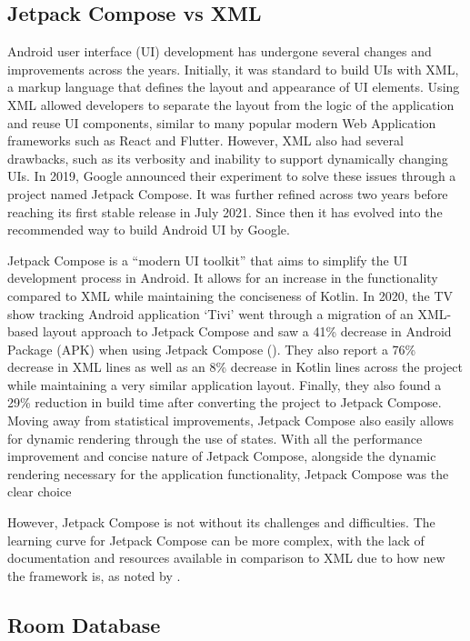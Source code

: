 \documentclass{l4proj}
\begin{document}
\subsection{Jetpack Compose vs XML}
\label{sec:composevsxml}

Android user interface (UI) development has undergone several changes and improvements across the years. Initially, it was standard to build UIs with XML, a markup language that defines the layout and appearance of UI elements. Using XML allowed developers to separate the layout from the logic of the application and reuse UI components, similar to many popular modern Web Application frameworks such as React and Flutter. However, XML also had several drawbacks, such as its verbosity and inability to support dynamically changing UIs. In 2019, Google announced their experiment to solve these issues through a project named Jetpack Compose.  It was further refined across two years before reaching its first stable release in July 2021. Since then it has evolved into the recommended way to build Android UI by Google.

Jetpack Compose is a “modern UI toolkit” that aims to simplify the UI development process in Android. It allows for an increase in the functionality compared to XML while maintaining the conciseness of Kotlin. In 2020, the TV show tracking Android application ‘Tivi’ went through a migration of an XML-based layout approach to Jetpack Compose and saw a 41\% decrease in Android Package (APK) when using Jetpack Compose (\cite{Banes_2020}). They also report a 76\% decrease in XML lines as well as an 8\% decrease in Kotlin lines across the project while maintaining a very similar application layout. Finally, they also found a 29\% reduction in build time after converting the project to Jetpack Compose. Moving away from statistical improvements, Jetpack Compose also easily allows for dynamic rendering through the use of states. With all the performance improvement and concise nature of Jetpack Compose, alongside the dynamic rendering necessary for the application functionality, Jetpack Compose was the clear choice

However, Jetpack Compose is not without its challenges and difficulties. The learning curve for Jetpack Compose can be more complex, with the lack of documentation and resources available in comparison to XML due to how new the framework is, as noted by \cite{Lomidze_2023}.

\subsection{Room Database}
\label{sec:room}
\end{document}
